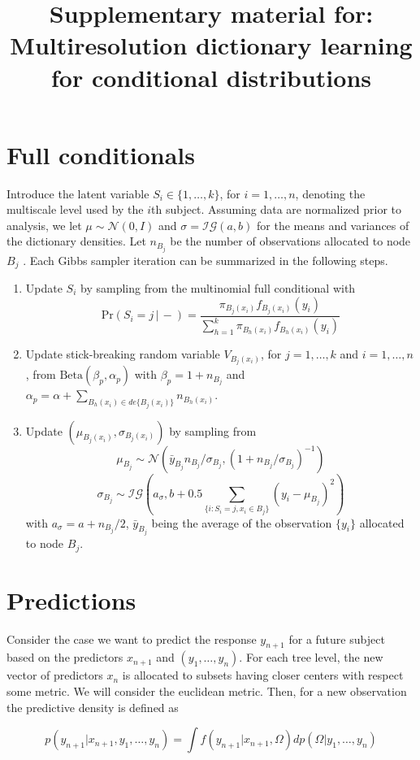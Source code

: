 \documentclass{article} %
\title{Supplementary material for: Multiresolution dictionary learning for conditional distributions}
\providecommand{\mc}[1]{\mathcal{#1}}
\begin{document}
\maketitle
\section{Full conditionals}
Introduce the latent variable $S_i \in \{1,\ldots,k\}$, for $i=1,\ldots,n$, denoting the multiscale level used by the $i$th subject.  Assuming data are normalized prior to analysis, we let $\mu \sim \mc{N}(0,I)$ and $\sigma=\mc{IG}(a,b)$ for the means and variances of the dictionary densities. Let $n_{B_j}$ be  the number of observations allocated to node $B_j$ . Each Gibbs sampler iteration can be summarized in the following steps.
\begin{enumerate}
\item Update $S_i$ by sampling from the multinomial full conditional with 
\[\mbox{Pr}( S_i = j\, |\, -) = \frac{ \pi_{B_j(x_i)}f_{B_j(x_i)}(y_i) }{ \sum_{h=1}^k \pi_{B_h(x_i)}f_{B_h(x_i)}(y_i) } \label{eq:prS}\]
\item Update stick-breaking random variable $V_{B_j(x_i)}$, for $j=1, \ldots, k$ and $i=1, \ldots, n$, from $\mbox{Beta}(\beta_p,\alpha_p)$ with $\beta_p=1+n_{B_j}$ and $\alpha_p=\alpha+\sum_{B_h(x_i) \in de\{B_j(x_i)\}} n_{B_h(x_i)}$.
\item Update $(\mu_{B_j(x_i)},\sigma_{B_j(x_i)})$ by sampling from
\[  \mu_{B_j} \sim \mc{N}\left(\bar{y}_{B_j} n_{B_j}/\sigma_{B_j},(1+n_{B_j}/\sigma_{B_j})^{-1}\right)\]
\[ \sigma_{B_j} \sim \mc{IG}\left(a_{\sigma},b+0.5\sum_{\{i: S_i=j,x_i \in B_j\}} \left(y_{i}-\mu_{B_j}\right)^2\right)\]
with $a_{\sigma}=a+n_{B_j}/2$, $\bar{y}_{B_j}$ being the average of the observation $\{y_i\}$ allocated to node $B_j$.
\end{enumerate}


\section{Predictions}\label{ch3:predictions}
Consider the case we want to predict the response $y_{n+1}$ for a future  subject based on the predictors $x_{n+1}$ and $(y_1, \ldots, y_n)$. For each tree level, the new vector of predictors $x_n$ is allocated to subsets having closer centers with respect some metric. We will consider the euclidean metric. Then, for a new observation the predictive density is defined as

\begin{equation}p(y_{n+1}|x_{n+1}, y_1, \ldots, y_n) = \int f\left(y_{n+1}|x_{n+1},\Omega\right) dp\left(\Omega|y_1, \ldots, y_n\right) \label{predictive:MSB}\end{equation}
\end{document}
